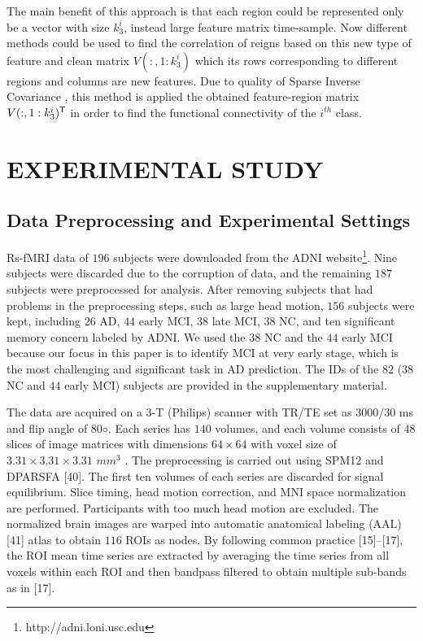 \documentclass[journal]{IEEEtran}
\begin{document}
	The main benefit of this approach is that each
	region could be represented only be a vector with size $k_3^i$, instead large feature matrix  time-sample. Now different methods could be used to find the correlation of reigns based on this new type of feature and clean matrix $V(:,1:k_{3}^i)$ which its rows corresponding to different regions and columns are new features. Due to quality of  Sparse Inverse Covariance ,  this method is applied the obtained  feature-region matrix  $V(:,1:k_3^i)^{\sf T}$  in order to find the functional connectivity of the $i^{th}$ class.


	\section{EXPERIMENTAL STUDY}
	\subsection{Data Preprocessing and Experimental Settings}
	
	Rs-fMRI data of $196$ subjects were downloaded from the ADNI website\footnote{http://adni.loni.usc.edu}. Nine subjects were discarded
	due to the corruption of data, and the remaining $187$ subjects were preprocessed for analysis. After removing subjects that had problems in the preprocessing steps, such as large head motion,
	$156$ subjects were kept, including $26$ AD, $44$ early MCI, $38$ late MCI, $38$ NC, and ten significant memory concern labeled by ADNI. We used the $38$ NC and the $44$ early MCI because our focus in this paper is to identify MCI at very early stage, which is the most challenging and significant task in AD
	prediction. The IDs of the $82$ ($38$ NC and $44$ early MCI) subjects are provided in the supplementary material. 
	
	The data are acquired on a $3$-T (Philips) scanner with TR/TE set as $3000/30$
	ms and flip angle of $80◦$. Each series has $140$ volumes, and each volume consists of 48 slices of image matrices with dimensions
	$64 \times 64$
	with voxel size of
	$ 3.31 \times  3.31 \times 3.31$
	$mm^3$ . The preprocessing is carried out using SPM12 and DPARSFA [40]. The
	first ten volumes of each series are discarded for signal equilibrium. Slice timing, head motion correction, and MNI space normalization are performed. Participants with too much head motion are excluded. The normalized brain images are warped into automatic anatomical labeling (AAL) [41] atlas to obtain $116$ ROIs as nodes. By following common practice [15]–[17], the ROI mean time series are extracted by averaging the time series from all voxels within each ROI and then bandpass filtered to obtain multiple sub-bands as in [17].
	
\end{document}
